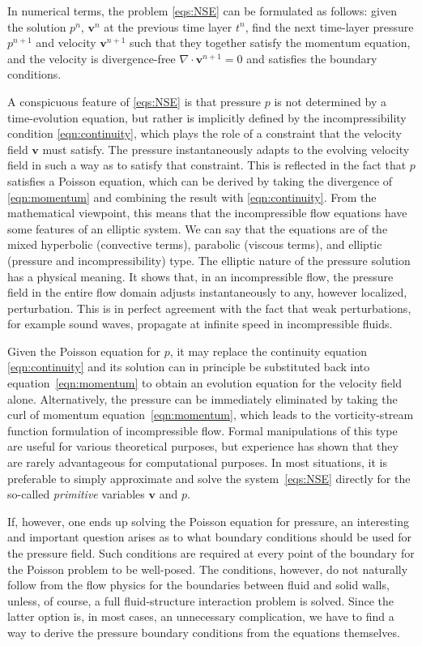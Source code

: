 \documentclass{article}
\begin{document}
In numerical terms, the problem \eqref{eqs:NSE} can be formulated as follows: given the solution $p^{n}$, $\boldsymbol{v}^{n}$ at the previous time layer $t^{n}$, find the next time-layer pressure $p^{n+1}$ and velocity $\boldsymbol{v}^{n+1}$ such that they together satisfy the momentum equation, and the velocity is divergence-free $\nabla \cdot \boldsymbol{v}^{n+1} = 0$ and satisfies the boundary conditions.

A conspicuous feature of \eqref{eqs:NSE} is that pressure $p$ is not determined by a time-evolution equation, but rather is implicitly defined by the incompressibility condition \eqref{eqn:continuity}, which plays the role of a constraint that the velocity field $\boldsymbol{v}$ must satisfy. The pressure instantaneously adapts to the evolving velocity field in such a way as to satisfy that constraint. This is reflected in the fact that $p$ satisfies a Poisson equation, which can be derived by taking the divergence of \eqref{eqn:momentum} and combining the result with \eqref{eqn:continuity}. From the mathematical viewpoint, this means that the incompressible flow equations have some features of an elliptic system. We can say that the equations are of the mixed hyperbolic (convective terms), parabolic (viscous terms), and elliptic (pressure and incompressibility) type. The elliptic nature of the pressure solution has a physical meaning. It shows that, in an incompressible flow, the pressure field in the entire flow domain adjusts instantaneously to any, however localized, perturbation. This is in perfect agreement with the fact that weak perturbations, for example sound waves, propagate at infinite speed in incompressible fluids.

Given the Poisson equation for $p$, it may replace the continuity equation \eqref{eqn:continuity} and its solution can in principle be substituted back into equation~\eqref{eqn:momentum} to obtain an evolution equation for the velocity field alone. Alternatively, the pressure can be immediately eliminated by taking the $\mathrm{curl}$ of momentum equation~\eqref{eqn:momentum}, which leads to the vorticity-stream function formulation of incompressible flow. Formal manipulations of this type are useful for various theoretical purposes, but experience has shown that they are rarely advantageous for computational purposes. In most situations, it is preferable to simply approximate and solve the system~\eqref{eqs:NSE} directly for the so-called \textit{primitive} variables $\boldsymbol{v}$ and $p$.

If, however, one ends up solving the Poisson equation for pressure, an interesting and important question arises as to what boundary conditions should be used for the pressure field. Such conditions are required at every point of the boundary for the Poisson problem to be well-posed. The conditions, however, do not naturally follow from the flow physics for the boundaries between fluid and solid walls, unless, of course, a full fluid-structure interaction problem is solved. Since the latter option is, in most cases, an unnecessary complication, we have to find a way to derive the pressure boundary conditions from the equations themselves.
\end{document}

